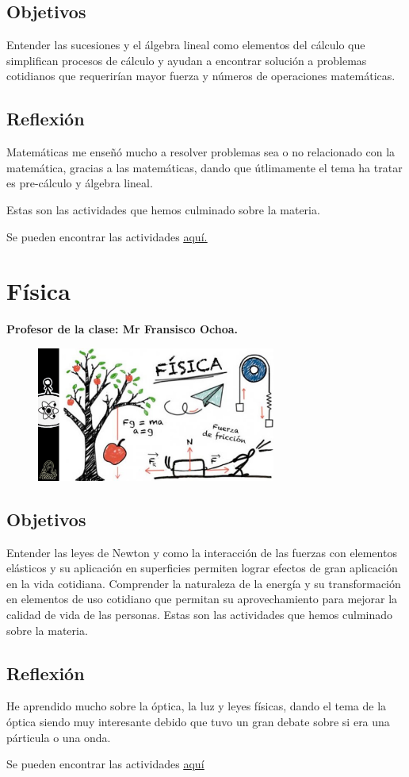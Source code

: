 \documentclass[a4paper, 12pt]{article}
\begin{document}
\subsection{Objetivos}
Entender las sucesiones y el álgebra lineal como elementos del cálculo que simplifican procesos de cálculo y ayudan a encontrar solución a problemas cotidianos que requerirían mayor fuerza y números de operaciones matemáticas.

\subsection{Reflexión}

Matemáticas me enseñó mucho a resolver problemas sea o no relacionado con la matemática, gracias a las matemáticas, dando que útlimamente el tema ha tratar es pre-cálculo y álgebra lineal.

Estas son las actividades que hemos culminado sobre la materia.

Se pueden encontrar las actividades \href{https://drive.google.com/drive/folders/1PRIU_AXDg9u1KO9Lou-fAq308nmebbqo?usp=sharing}{\underline{aquí.}}

\section{Física}
\textbf{Profesor de la clase: Mr Fransisco Ochoa.}

\begin{figure}[h]
  \includegraphics[width=0.7\textwidth, center]{fisi.jpeg}
\end{figure}

\subsection{Objetivos}
Entender las leyes de Newton y como la interacción de las fuerzas con elementos elásticos y su aplicación en superficies permiten lograr efectos de gran aplicación en la vida cotidiana. Comprender la naturaleza de la energía y su transformación en elementos de uso cotidiano que permitan su aprovechamiento para mejorar la calidad de vida de las personas.
Estas son las actividades que hemos culminado sobre la materia.

\subsection{Reflexión}
He aprendido mucho sobre la óptica, la luz y leyes físicas, dando el tema de la óptica siendo muy interesante debido que tuvo un gran debate sobre si era una párticula o una onda.

Se pueden encontrar las actividades \href{https://drive.google.com/drive/folders/1TrRKvzmpVNuXv89DHbMKKkIT746Uk8yG?usp=sharing}{\underline{aquí}}
\end{document}
